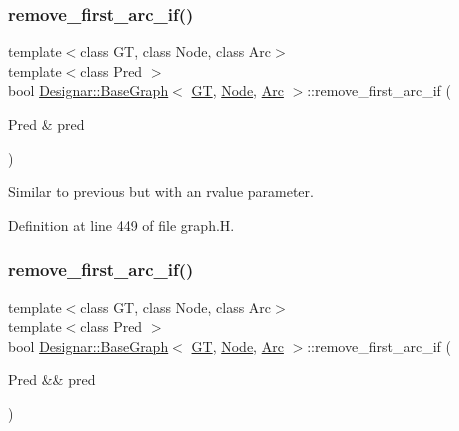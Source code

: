 \subsubsection{\texorpdfstring{remove\+\_\+first\+\_\+arc\+\_\+if()}{remove\_first\_arc\_if()}\hspace{0.1cm}{\footnotesize\ttfamily [1/2]}}
{\footnotesize\ttfamily template$<$class GT, class Node, class Arc$>$ \\
template$<$class Pred $>$ \\
bool \hyperlink{class_designar_1_1_base_graph}{Designar\+::\+Base\+Graph}$<$ \hyperlink{demo-buildgraph_8_c_a3001c40d2c31ca87ed96cd7d1334a55e}{GT}, \hyperlink{namespace_designar_a5af326c65aa2bd26b26c410f2030d09e}{Node}, \hyperlink{namespace_designar_a3f55fb5513d62ff47cbc8f72b8e95d6f}{Arc} $>$\+::remove\+\_\+first\+\_\+arc\+\_\+if (\begin{DoxyParamCaption}\item[{Pred \&}]{pred }\end{DoxyParamCaption})\hspace{0.3cm}{\ttfamily [inline]}}



Similar to previous but with an rvalue parameter. 



Definition at line 449 of file graph.\+H.

\mbox{\label{class_designar_1_1_base_graph_a990426c9e87f922bbbd0c9bc4d2cedd8}} 
\subsubsection{\texorpdfstring{remove\+\_\+first\+\_\+arc\+\_\+if()}{remove\_first\_arc\_if()}\hspace{0.1cm}{\footnotesize\ttfamily [2/2]}}
{\footnotesize\ttfamily template$<$class GT, class Node, class Arc$>$ \\
template$<$class Pred $>$ \\
bool \hyperlink{class_designar_1_1_base_graph}{Designar\+::\+Base\+Graph}$<$ \hyperlink{demo-buildgraph_8_c_a3001c40d2c31ca87ed96cd7d1334a55e}{GT}, \hyperlink{namespace_designar_a5af326c65aa2bd26b26c410f2030d09e}{Node}, \hyperlink{namespace_designar_a3f55fb5513d62ff47cbc8f72b8e95d6f}{Arc} $>$\+::remove\+\_\+first\+\_\+arc\+\_\+if (\begin{DoxyParamCaption}\item[{Pred \&\&}]{pred }\end{DoxyParamCaption})\hspace{0.3cm}{\ttfamily [inline]}}



